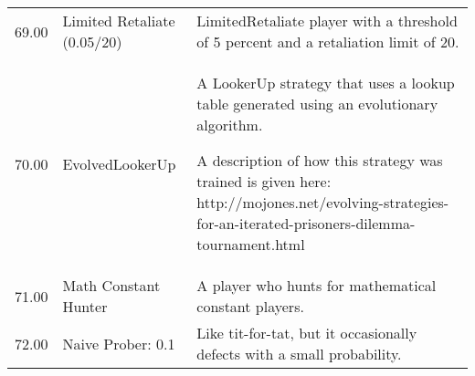 \begin{tabular}{rll}
	69.00  & Limited Retaliate (0.05/20) & LimitedRetaliate player with a threshold of 5 percent and a
	retaliation limit of 20.                                                                                                                                                                                                                                                                                                                                                                                                                                                                                                                                                                                                                                                                                                                                                                                                                                                                                                                                 \\
	70.00  & EvolvedLookerUp             & A LookerUp strategy that uses a lookup table generated using an evolutionary
	algorithm.

	A description of how this strategy was trained is given here:
	http://mojones.net/evolving-strategies-for-an-iterated-prisoners-dilemma-tournament.html                                                                                                                                                                                                                                                                                                                                                                                                                                                                                                                                                                                                                                                                                                                                                              \\
	71.00  & Math Constant Hunter        & A player who hunts for mathematical constant players.                                                                             \\
	72.00  & Naive Prober: 0.1           & Like tit-for-tat, but it occasionally defects with a small probability.


\end{tabular}
